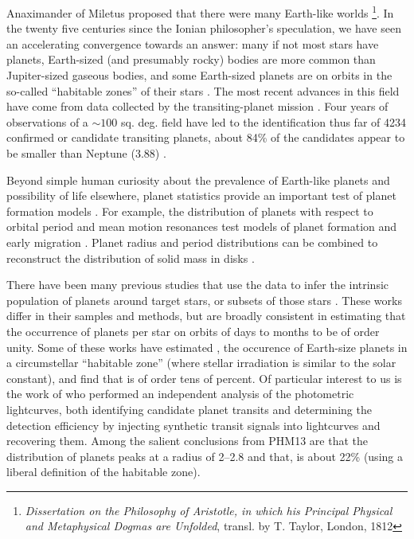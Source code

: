 Anaximander of Miletus proposed that there were many Earth-like worlds
\footnote{{\it Dissertation on the Philosophy of Aristotle, in which
    his Principal Physical and Metaphysical Dogmas are Unfolded},
  transl. by T. Taylor, London, 1812}.  In the twenty five centuries
since the Ionian philosopher's speculation, we have seen an
accelerating convergence towards an answer: many if not most stars
have planets, Earth-sized (and presumably rocky) bodies are more 
common than Jupiter-sized gaseous bodies, and
some Earth-sized planets are on orbits in the so-called
``habitable zones'' of their stars \citep{Schneider2011}. The most recent advances in this
field have come from data collected by the \kep{} transiting-planet
mission \citep{Borucki2010}.  Four years of observations of a $\sim
100$ sq. deg. field have led to the identification thus far
of 4234 confirmed or candidate transiting planets, about 84\% of the
candidates appear to be smaller than Neptune (3.88\rearth{}) \citep{NASAEA}.

Beyond simple human curiosity about the prevalence of Earth-like
planets and possibility of life elsewhere, planet statistics provide
an important test of planet formation models \citep[e.g.][]{Benz2014}.
For example, the distribution of planets with respect to orbital
period and mean motion resonances test models of planet formation and
early migration \citep[e.g.,][]{HansenMurray,Baruteau2013}.  Planet
radius and period distributions can be combined to reconstruct the
distribution of solid mass in disks
\citep[e.g.,][]{Chiang2013,Raymond2014}.

There have been many previous studies that use the \kep{} data to
infer the intrinsic population of planets around \kep{} target stars,
or subsets of those stars
\citep[e.g.][]{Catanzarite,Youdin,Traub2012,Howard2012,Fressin2013,
  Dressing2013,Gaidos2013,Dong2013,Kopparapu2013b,Petigura2013}.
These works differ in their samples and methods, but are broadly
consistent in estimating that the occurrence of planets per star on orbits of days to months
to be of order unity.  Some of these works have estimated \ee{}, the
occurence of Earth-size planets in a circumstellar ``habitable zone''
(where stellar irradiation is similar to the solar constant), and find
that \ee{} is of order tens of percent.  Of particular interest to us
is the work of \citet[][hereafter PHM13]{Petigura2013} who performed
an independent analysis of the \kep{} photometric lightcurves, both
identifying candidate planet transits and determining the detection
efficiency by injecting synthetic transit signals into \kep{}
lightcurves and recovering them.  Among the salient conclusions from
PHM13 are that the distribution of planets peaks at a radius of
2--2.8\rearth{} and that, \ee{} is about 22\% (using a liberal
definition of the habitable zone).

